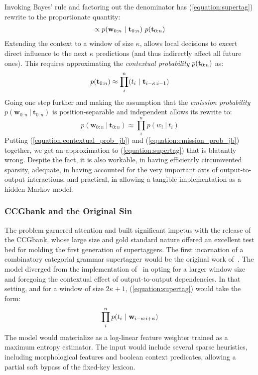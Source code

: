 Invoking Bayes' rule and factoring out the denominator has (\ref{equation:supertag}) rewrite to the proportionate quantity:
\begin{align}
\propto p(\mathbf{w}_{0:n} \ | \ \mathbf{t}_{0:n})~ p(\mathbf{t}_{0:n})
\end{align}
Extending the context to a window of size $\kappa$, allows local decisions to excert direct influence to the next $\kappa$ predictions (and thus indirectly affect all future ones).
This requires approximating the \textit{contextual probability} $p(\mathbf{t}_{0:n})$ as:
\begin{equation}\label{equation:contextual_prob_jb}
p(\mathbf{t}_{0:n}) \approx \prod_i^n (t_i \ | \ \mathbf{t}_{i-\kappa:i-1})
\end{equation}
Going one step further and making the assumption that the \textit{emission probability} $p(\mathbf{w}_{0:n} \ | \ \mathbf{t}_{0:n})$ is position-separable and independent allows its rewrite to:
\begin{equation}\label{equation:emission_prob_jb}
p(\mathbf{w}_{0:n} \ | \ \mathbf{t}_{0:n}) \approx \prod_i^n p(w_i \ | \ t_i)
\end{equation}
Putting (\ref{equation:contextual_prob_jb}) and (\ref{equation:emission_prob_jb}) together, we get an approximation to (\ref{equation:supertag}) that is blatantly wrong.
Despite the fact, it is also workable, in having efficiently circumvented sparsity, adequate, in having accounted for the very important axis of output-to-output interactions, and practical, in allowing a tangible implementation as a hidden Markov model.


\subsubsection{CCGbank and the Original Sin}
The problem garnered attention and built significant impetus with the release of the CCGbank, whose large size and gold standard nature offered an excellent test bed for molding the first generation of supertaggers.
The first incarnation of a combinatory categorial grammar supertagger would be the original work of~\citet{clark2002supertagging}.
The model diverged from the implementation of~\citet{bangalore1999supertagging} in opting for a larger window size and foregoing the contextual effect of output-to-output dependencies.
In that setting, and for a window of size $2\kappa + 1$, (\ref{equation:supertag}) would take the form:
\begin{equation}
	\prod_i^n p(t_i \ | \ \mathbf{w}_{i - \kappa : i+\kappa})
\end{equation}
The model would materialize as a log-linear feature weighter trained as a maximum entropy estimator.
The input would include several sparse heuristics, including morphological features and boolean context predicates, allowing a partial soft bypass of the fixed-key lexicon.

